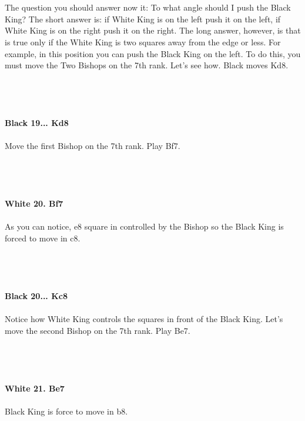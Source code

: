 \documentclass{article}
\begin{document}

\\
\\
The question you should answer now it: To what angle should I push the Black King? The short answer is: if White King is on the left push it on the left, if White King is on the right push it on the right. The long answer, however, is that is true only if the White King is two squares away from the edge or less. For example, in this position you can push the Black King on the left. To do this, you must move the Two Bishops on the 7th rank. Let's see how. Black moves Kd8.\\\\
\\

\\
\\
\textbf{Black 19... Kd8}\\
\\
Move the first Bishop on the 7th rank. Play Bf7.\\\\
\\

\\
\\
\textbf{White 20. Bf7}\\
\\
As you can notice, e8 square in controlled by the Bishop so the Black King is forced to move in c8.\\\\
\\

\\
\\
\textbf{Black 20... Kc8}\\
\\
Notice how White King controls the squares in front of the Black King. Let's move the second Bishop on the 7th rank. Play Be7.\\\\
\\

\\
\\
\textbf{White 21. Be7}\\
\\
Black King is force to move in b8.\\\\
\end{document}
